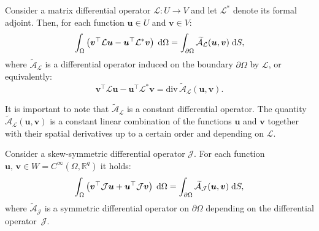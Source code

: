 \begin{theorem}\label{th:rogers}
	Consider a matrix differential operator $\mathcal{L} : U \rightarrow V$ and let $\mathcal{L}^*$ denote its formal adjoint. Then, for each function $\bm{u} \in {U}$ and $\bm{v} \in {V}$:
	\begin{equation}
	\int_{\Omega} \left( \bm{v}^\top \mathcal{L} \bm{u} - \bm{u}^\top \mathcal{L}^* \bm{v}\right) \d\Omega= \int_{\partial \Omega} \widetilde{\mathcal{A}}_{\mathcal{L}}(\bm{u}, \bm{v}) \d{S},
	\end{equation}
	where $\widetilde{\mathcal{A}}_{\mathcal{L}}$ is a differential operator induced on the boundary $\partial\Omega$ by $\mathcal{L}$, or equivalently:
	\begin{equation}
	\bm{v}^\top \mathcal{L} \bm{u} - \bm{u}^\top \mathcal{L}^* \bm{v} = \mathrm{div} \, \widetilde{\mathcal{A}}_{\mathcal{L}}(\bm{u}, \bm{v}).
	\end{equation}
\end{theorem}
It is important to note that $\widetilde{\mathcal{A}}_{\mathcal{L}}$ is a constant differential operator. The quantity $\widetilde{\mathcal{A}}_{\mathcal{L}}(\bm{u}, \bm{v})$ is a constant linear combination of the functions $\bm{u}$ and $\bm{v}$ together with their spatial derivatives up to a certain order and depending on $\mathcal{L}$. 

\begin{corollary} 
		Consider a skew-symmetric differential operator $\mathcal{J}$. For each function $\bm{u}, \, \bm{v} \in W=C^{\infty}(\Omega, \mathbb{R}^{q})$ it holds:
	\begin{equation}
	\int_{\Omega} \left( \bm{v}^\top \mathcal{J} \bm{u} + \bm{u}^\top \mathcal{J} \bm{v}\right) \d\Omega= \int_{\partial \Omega} \widetilde{\mathcal{A}}_{\mathcal{J}}(\bm{u}, \bm{v}) \d{S},
	\end{equation}
	where $\widetilde{\mathcal{A}}_{\mathcal{J}}$ is a symmetric differential operator on $\partial\Omega$ depending on the differential operator~$\mathcal{J}$.
\end{corollary}


